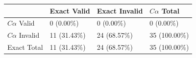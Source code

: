\begin{tabular}{llll}
\toprule
 & Exact Valid & Exact Invalid & $C\alpha$ Total \\
\midrule
$C\alpha$ Valid & 0 (0.00\%) & 0 (0.00\%) & 0 (0.00\%) \\
$C\alpha$ Invalid & 11 (31.43\%) & 24 (68.57\%) & 35 (100.00\%) \\
Exact Total & 11 (31.43\%) & 24 (68.57\%) & 35 (100.00\%) \\
\bottomrule
\end{tabular}
